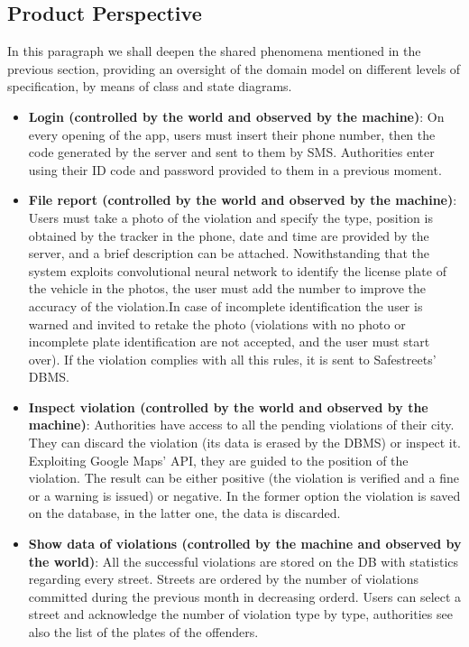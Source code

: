 \subsection {Product Perspective}

In this paragraph we shall deepen the shared phenomena mentioned in the previous section, providing an oversight of the domain model on different levels of specification, by means of class and state diagrams.

\begin{itemize}

\item \textbf{Login (controlled by the world and observed by the machine)}: On every opening of the app, users must insert their phone number, then the code generated by the server and sent to them by SMS. Authorities enter using their ID code and password provided to them in a previous moment.

\item \textbf{File report (controlled by the world and observed by the machine)}: Users must take a photo of the violation and specify the type, position is obtained by the tracker in the phone, date and time are provided by the server, and a brief description can be attached. Nowithstanding that the system exploits convolutional neural network to identify the license plate of the vehicle in the photos, the user must add the number to improve the accuracy of the violation.In case of incomplete identification the user is warned and invited to retake the photo (violations with no photo or incomplete plate identification are not accepted, and the user must start over). If the violation complies with all this rules, it is sent to Safestreets' DBMS.

\item \textbf{Inspect violation (controlled by the world and observed by the machine)}: Authorities have access to all the pending violations of their city. They can discard the violation (its data is erased by the DBMS) or inspect it. Exploiting Google Maps' API, they are guided to the position of the violation. The result can be either positive (the violation is verified and a fine or a warning is issued) or negative. In the former option the violation is saved on the database, in the latter one, the data is discarded.

\item \textbf{Show data of violations (controlled by the machine and observed by the world)}: All the successful violations are stored on the DB with statistics regarding every street. Streets are ordered by the number of violations committed during the previous month in decreasing orderd. Users can select a street and acknowledge the number of violation type by type, authorities see also the list of the plates of the offenders.


\end{itemize}
